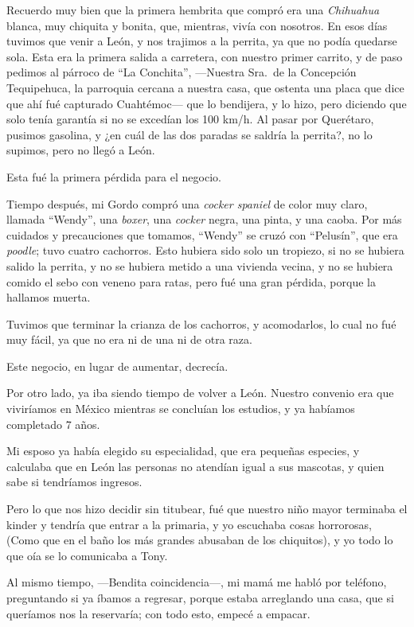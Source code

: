 \documentclass[letterpaper, 12pt]{book}
\begin{document}
Recuerdo muy bien que la primera hembrita que compró era una \textit{Chihuahua} blanca, muy chiquita y bonita, que, mientras, vivía con nosotros. En esos días tuvimos que venir a León, y nos trajimos a la perrita, ya que no podía quedarse sola. Esta era la primera salida a carretera, con nuestro primer carrito, y de paso pedimos al párroco de ``La Conchita'', ---Nuestra Sra.\ de la Concepción Tequipehuca, la parroquia cercana a nuestra casa, que ostenta una placa que dice que ahí fué capturado Cuahtémoc--- que lo bendijera, y lo hizo, pero diciendo que solo tenía garantía si no se excedían los 100 km/h. Al pasar por Querétaro, pusimos gasolina, y ¿en cuál de las dos paradas se saldría la perrita?, no lo supimos, pero no llegó a León. 

Esta fué la primera pérdida para el negocio.

Tiempo después, mi Gordo compró una \textit{cocker spaniel} de color muy claro, llamada ``Wendy'', una \textit{boxer}, una \textit{cocker} negra, una pinta, y una caoba. Por más cuidados y precauciones que tomamos, ``Wendy'' se cruzó con ``Pelusín'', que era \textit{poodle}; tuvo cuatro cachorros. Esto hubiera sido solo un tropiezo, si no se hubiera salido la perrita, y no se hubiera metido a una vivienda vecina, y no se hubiera comido el sebo con veneno para ratas, pero fué una gran pérdida, porque la hallamos muerta. 

Tuvimos que terminar la crianza de los cachorros, y acomodarlos, lo cual no fué muy fácil, ya que no era ni de una ni de otra raza.

Este negocio, en lugar de aumentar, decrecía.

Por otro lado, ya iba siendo tiempo de volver a León. Nuestro convenio era que viviríamos en México mientras se concluían los estudios, y ya habíamos completado 7 años.

Mi esposo ya había elegido su especialidad, que era pequeñas especies, y calculaba que en León las personas no atendían igual a sus mascotas, y quien sabe si tendríamos ingresos.

Pero lo que nos hizo decidir sin titubear, fué que nuestro niño mayor terminaba el kinder y tendría que entrar a la primaria, y yo escuchaba cosas horrorosas, (Como que en el baño los más grandes abusaban de los chiquitos), y yo todo lo que oía se lo comunicaba a Tony.

Al mismo tiempo, ---Bendita coincidencia---, mi mamá me habló por teléfono, preguntando si ya íbamos a regresar, porque estaba arreglando una casa, que si queríamos nos la reservaría; con todo esto, empecé a empacar.
\end{document}
